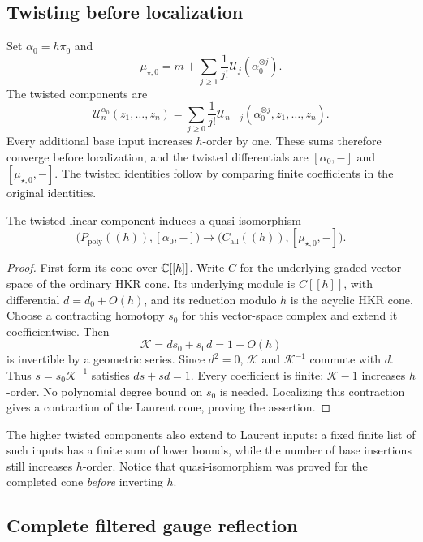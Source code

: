 \subsection*{Twisting before localization}

Set $\alpha_0=h\pi_0$ and
\[
 \mu_{\star,0}=m+\sum_{j\ge1}\frac1{j!}\mathcal U_j(\alpha_0^{\otimes j}).
\]
The twisted components are
\[
 \mathcal U_n^{\alpha_0}(z_1,\ldots,z_n)
 =\sum_{j\ge0}\frac1{j!}
   \mathcal U_{n+j}(\alpha_0^{\otimes j},z_1,\ldots,z_n).
\]
Every additional base input increases $h$-order by one.  These sums
therefore converge before localization, and the twisted differentials
are $[\alpha_0,-]$ and $[\mu_{\star,0},-]$.  The twisted identities follow by
comparing finite coefficients in the original identities.

\begin{lemma}\label{lem:twisted-quasi-iso}
The twisted linear component induces a quasi-isomorphism
\[
 \bigl(P_{\mathrm{poly}}((h)),[\alpha_0,-]\bigr)
 \longrightarrow
 \bigl(C_{\mathrm{all}}((h)),[\mu_{\star,0},-]\bigr).
\]
\end{lemma}
\begin{proof}
First form its cone over $\mathbb C[[h]]$. Write $C$ for the underlying
graded vector space of the ordinary HKR cone. Its underlying module
is $C[[h]]$, with differential $d=d_0+O(h)$, and its reduction
modulo $h$ is the acyclic HKR cone.  Choose a contracting homotopy
$s_0$ for this vector-space complex and extend it coefficientwise.
Then
\[
 \mathcal K=ds_0+s_0d=1+O(h)
\]
is invertible by a geometric series.  Since $d^2=0$, $\mathcal K$ and $\mathcal K^{-1}$
commute with $d$.  Thus $s=s_0\mathcal K^{-1}$ satisfies $ds+sd=1$.  Every
coefficient is finite: $\mathcal K-1$ increases $h$-order.  No polynomial
degree bound on $s_0$ is needed.  Localizing this contraction gives a
contraction of the Laurent cone, proving the assertion.
\end{proof}

The higher twisted components also extend to Laurent inputs: a fixed
finite list of such inputs has a finite sum of lower bounds, while
the number of base insertions still increases $h$-order.  Notice
that quasi-isomorphism was proved for the completed cone \emph{before}
inverting $h$.

\subsection*{Complete filtered gauge reflection}

